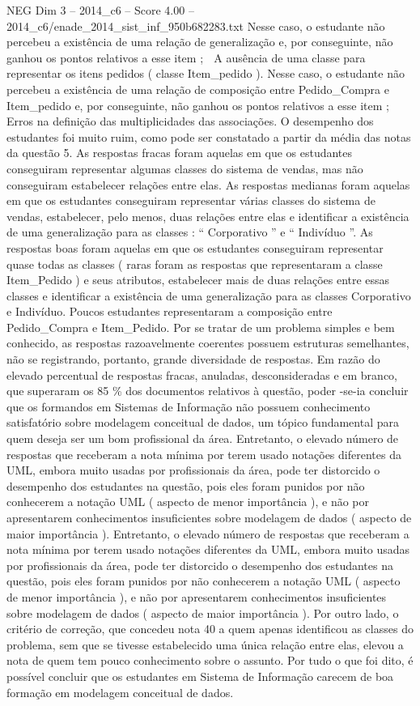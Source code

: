 \begin{textsample}{NEG Dim 3 – 2014\_c6 – Score 4.00 – 2014\_c6/enade\_2014\_sist\_inf\_950b682283.txt}
Nesse caso, o estudante não percebeu a existência de uma relação de generalização e, por conseguinte, não ganhou os pontos relativos a esse item ;  A ausência de uma classe para representar os itens pedidos ( classe Item\_pedido ).
Nesse caso, o estudante não percebeu a existência de uma relação de composição entre Pedido\_Compra e Item\_pedido e, por conseguinte, não ganhou os pontos relativos a esse item ;  Erros na definição das multiplicidades das associações.
O desempenho dos estudantes foi muito ruim, como pode ser constatado a partir da média das notas da questão 5.
As respostas fracas foram aquelas em que os estudantes conseguiram representar algumas classes do sistema de vendas, mas não conseguiram estabelecer relações entre elas.
As respostas medianas foram aquelas em que os estudantes conseguiram representar várias classes do sistema de vendas, estabelecer, pelo menos, duas relações entre elas e identificar a existência de uma generalização para as classes : “ Corporativo ” e “ Indivíduo ”.
As respostas boas foram aquelas em que os estudantes conseguiram representar quase todas as classes ( raras foram as respostas que representaram a classe Item\_Pedido ) e seus atributos, estabelecer mais de duas relações entre essas classes e identificar a existência de uma generalização para as classes Corporativo e Indivíduo.
Poucos estudantes representaram a composição entre Pedido\_Compra e Item\_Pedido.
Por se tratar de um problema simples e bem conhecido, as respostas razoavelmente coerentes possuem estruturas semelhantes, não se registrando, portanto, grande diversidade de respostas.
Em razão do elevado percentual de respostas fracas, anuladas, desconsideradas e em branco, que superaram os 85 \% dos documentos relativos à questão, poder -se-ia concluir que os formandos em Sistemas de Informação não possuem conhecimento satisfatório sobre modelagem conceitual de dados, um tópico fundamental para quem deseja ser um bom profissional da área.
Entretanto, o elevado número de respostas que receberam a nota mínima por terem usado notações diferentes da UML, embora muito usadas por profissionais da área, pode ter distorcido o desempenho dos estudantes na questão, pois eles foram punidos por não conhecerem a notação UML ( aspecto de menor importância ), e não por apresentarem conhecimentos insuficientes sobre modelagem de dados ( aspecto de maior importância ).
Entretanto, o elevado número de respostas que receberam a nota mínima por terem usado notações diferentes da UML, embora muito usadas por profissionais da área, pode ter distorcido o desempenho dos estudantes na questão, pois eles foram punidos por não conhecerem a notação UML ( aspecto de menor importância ), e não por apresentarem conhecimentos insuficientes sobre modelagem de dados ( aspecto de maior importância ).
Por outro lado, o critério de correção, que concedeu nota 40 a quem apenas identificou as classes do problema, sem que se tivesse estabelecido uma única relação entre elas, elevou a nota de quem tem pouco conhecimento sobre o assunto.
Por tudo o que foi dito, é possível concluir que os estudantes em Sistema de Informação carecem de boa formação em modelagem conceitual de dados.

\end{textsample}
